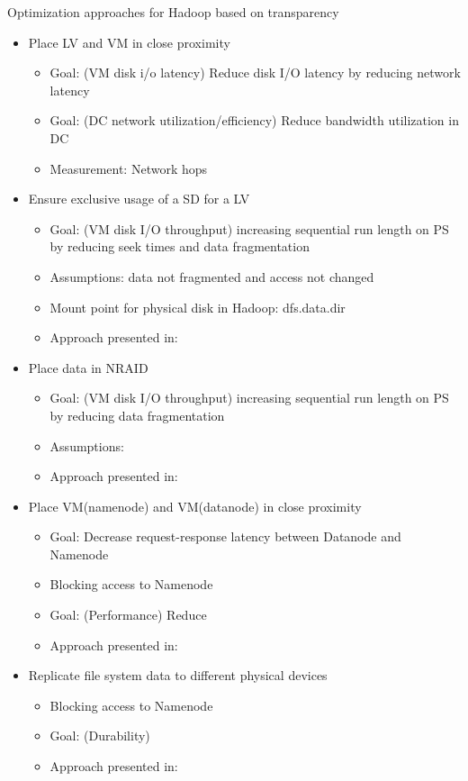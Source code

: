 	Optimization approaches for Hadoop based on transparency
	\begin{itemize}
		\item Place LV and VM in close proximity
		\begin{itemize}
			\item Goal: (VM disk i/o latency) Reduce disk I/O latency by reducing network latency
			\item Goal: (DC network utilization/efficiency) Reduce bandwidth utilization in DC
			\item Measurement: Network hops
		\end{itemize}	
		\item Ensure exclusive usage of a SD for a LV
		\begin{itemize}
			\item Goal: (VM disk I/O throughput) increasing sequential run length on PS by reducing seek times and data fragmentation 
			\item Assumptions: data not fragmented and access not changed
			\item Mount point for physical disk in Hadoop: dfs.data.dir			
			\item Approach presented in: \cite{Shaffer2010}
		\end{itemize}
		\item Place data in NRAID
		\begin{itemize}
			\item Goal: (VM disk I/O throughput) increasing sequential run length on PS by reducing data fragmentation
			\item Assumptions:
			\item Approach presented in:
		\end{itemize}
		
		\item Place VM(namenode) and VM(datanode) in close proximity
		\begin{itemize}
			\item Goal: Decrease request-response latency between Datanode and Namenode
			\item Blocking access to Namenode
			\item Goal: (Performance) Reduce
			\item Approach presented in: \cite{Shaffer2010}
		\end{itemize}
		\item Replicate file system data to different physical devices
		\begin{itemize}
			\item Blocking access to Namenode
			\item Goal: (Durability)
			\item Approach presented in: \cite{Shaffer2010}
		\end{itemize}
	\end{itemize}
	
